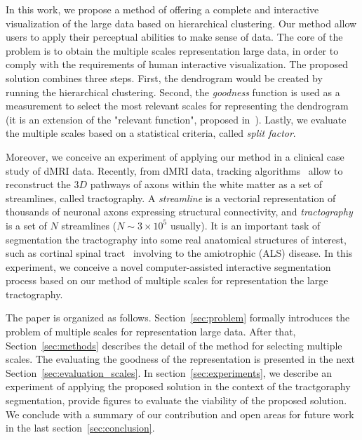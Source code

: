 In this work, we propose a method of offering a complete and interactive visualization of the large data based on hierarchical clustering. Our method allow users to apply their perceptual abilities to make sense of data. 
The core of the problem is to obtain the multiple scales representation large data, in order to comply with the requirements of human interactive visualization. The proposed solution combines three steps. First, the dendrogram would be created by running the hierarchical clustering. Second, the \emph{goodness} function is used as a measurement to select the most relevant scales for representing the dendrogram (it is an extension of the "relevant function", proposed in~\cite{pons2011postprocessing}). Lastly, we evaluate the multiple scales based on a 
statistical criteria, called \emph{split factor}. 

\vspace{0.5mm}
Moreover, we conceive an experiment of applying our method in a clinical case study of dMRI data. %
Recently, from dMRI data, tracking algorithms~\cite{mori2002fiber,zhang2008identifying} allow to reconstruct the $3D$ pathways of axons within the white matter %
as a set of streamlines, called tractography. A \emph{streamline} is a vectorial representation of thousands of neuronal axons expressing structural connectivity, and \emph{tractography} is a set of $N$ streamlines ($N \sim 3 \times 10^5$ usually). It is an important task of segmentation the tractography into some real anatomical structures of interest, such as cortinal spinal tract~\cite{cosottini2010evaluation,sage2009quantitative} involving to the amiotrophic (ALS) disease. In this experiment, we conceive a novel computer-assisted interactive segmentation process based on our method of multiple scales for representation the large tractography.

The paper is organized as follows. Section~\ref{sec:problem} formally introduces the problem of multiple scales for representation large data. After that, Section~\ref{sec:methods} describes the detail of the method for selecting multiple scales. The evaluating the goodness of the representation is presented in the next Section~\ref{sec:evaluation_scales}.
In section~\ref{sec:experiments}, we describe an experiment of applying the proposed solution in the context of the tractgoraphy segmentation, provide figures to evaluate the viability of the proposed solution. We conclude with a summary of our contribution and open areas for future work in the last section~\ref{sec:conclusion}.



